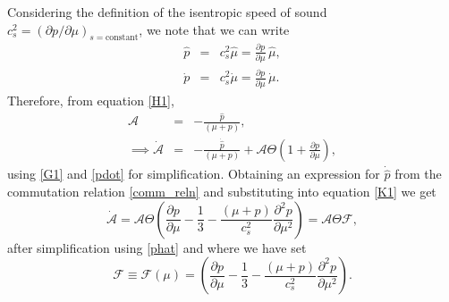 \documentclass[abstract=on,notitlepage,superscriptaddress,nofootinbib,aps,showpacs,twocolumn,prd]{revtex4}
\newcommand{\0}{^{(0)}}
\newcommand{\1}{^{(1)}}
\newcommand{\2}{^{(2)}}
\newcommand{\3}{{}^{(3)}}
\begin{document}
Considering the definition of the isentropic speed of sound $c_s^2 = \left(\partial p/ \partial \mu\right)_{s = \text{constant}}$, we note that we can write
\begin{eqnarray}
\hat{p} &=& c_s^2 \hat{\mu} = \frac{\partial p}{\partial \mu}\,\hat{\mu},\\ \label{phat}
 \dot{p} &=& c_s^2\dot{\mu} =\frac{\partial p}{\partial \mu}\,\dot{\mu} . \label{pdot}
\end{eqnarray}
Therefore, from equation \eqref{H1},
\begin{eqnarray}
	  \mathcal{A} &=& -\frac{\hat{p}}{(\mu+p)},\nonumber \\
	\implies \dot{\mathcal{A}} &=& -\frac{\dot{\hat{p}}}{(\mu+p)}+\mathcal{A}\Theta\left(1+\frac{\partial p}{\partial \mu}\right), \label{K1}
\end{eqnarray}
using  \eqref{G1}  and \eqref{pdot} for simplification. Obtaining an expression for $\dot{\hat{p}}$ from the commutation relation \eqref{comm_reln} and substituting into equation \eqref{K1} we get
\begin{equation}
	\dot{\mathcal{A}}=\mathcal{A}\Theta\left(\frac{\partial p}{\partial \mu}-\frac{1}{3}-\frac{(\mu+p)}{c_s^2}\frac{\partial^2 p}{\partial \mu^2}\right)=\mathcal{A}\Theta\mathcal{F},\label{K}
\end{equation}
after simplification using \eqref{phat} and where we have set
\begin{equation}
\mathcal{F} \equiv \mathcal{F}(\mu) = \left(\frac{\partial p}{\partial \mu}-\frac{1}{3}-\frac{(\mu+p)}{c_s^2}\frac{\partial^2 p}{\partial \mu^2}\right).
\end{equation}
\end{document}
